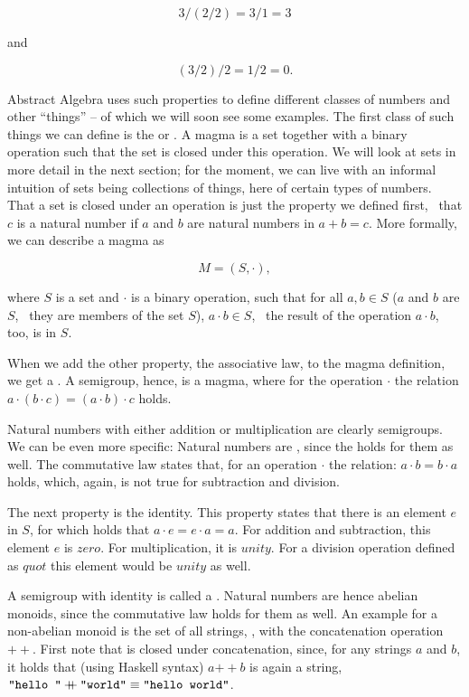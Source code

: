 \documentclass{scrreprt}
\newcommand{\Varid}[1]{\mathit{#1}}
\newcommand{\plus}{\mathbin{+\!\!\!+}}
\begin{document}
\[
3 / (2 / 2) = 3 / 1 = 3
\]

and

\[
(3 / 2) / 2 = 1 / 2 = 0.
\]

Abstract Algebra uses such properties
to define different classes of numbers and
other ``things'' -- of which we will soon see some examples.
The first class of such things we can define
is the  or .
A magma is a
set together with a binary operation
such that the set is closed under this operation.
We will look at sets in more detail in the next section;
for the moment, we can live with an informal intuition
of sets being collections of things,
here of certain types of numbers.
That a set is closed under an operation is just the property
we defined first, \ie\ that $c$ is a natural number
if $a$ and $b$ are natural numbers in $a + b = c$.
More formally, we can describe a magma as

\begin{equation}
M = (S,\cdot),
\end{equation}

where $S$ is a set and $\cdot$ is a binary operation, such that
for all $a,b \in S$ ($a$ and $b$ are  $S$,
\ie\ they are members of the set $S$), $a \cdot b \in S$,
\ie\ the result of the operation $a \cdot b$, too, is in $S$.

When we add the other property,
the associative law, to the magma definition,
we get a .
A semigroup, hence, is a magma,
where for the operation $\cdot$ the relation
$a \cdot (b \cdot c) = (a \cdot b) \cdot c$
holds.

Natural numbers with either addition or multiplication
are clearly semigroups.
We can be even more specific:
Natural numbers are ,
since the  holds for them
as well.
The commutative law states that, for an operation $\cdot$
the relation:
$a \cdot b = b \cdot a$ holds,
which, again, is not true for subtraction
and division.

The next property is the identity.
This property states that there is an element $e$ in $S$,
for which holds that
$a \cdot e = e \cdot a = a$.
For addition and subtraction, this element $e$ is \ensuremath{\Varid{zero}}.
For multiplication, it is \ensuremath{\Varid{unity}}.
For a division operation defined as \ensuremath{\Varid{quot}} 
this element would be \ensuremath{\Varid{unity}} as well.

A semigroup with identity is called a .
Natural numbers are hence abelian monoids,
since the commutative law holds for them as well.
An example for a non-abelian monoid 
is the set of all strings, ,
with the concatenation operation \ensuremath{\plus }.
First note that  is closed under concatenation,
since, for any strings $a$ and $b$, it holds that (using Haskell syntax)
\ensuremath{\Varid{a}\plus \Varid{b}} is again a string, \eg\:
\ensuremath{\text{\tt \char34 hello~\char34}\plus \text{\tt \char34 world\char34}\equiv \text{\tt \char34 hello~world\char34}}.
\end{document}

